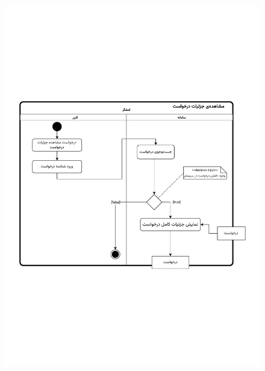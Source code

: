 \begin{figure}[ht!]
	\centering
	\includegraphics[scale=0.8, page=1]{figs/OOD-activity-detailreq.pdf}
\end{figure}
\FloatBarrier
\newpage

